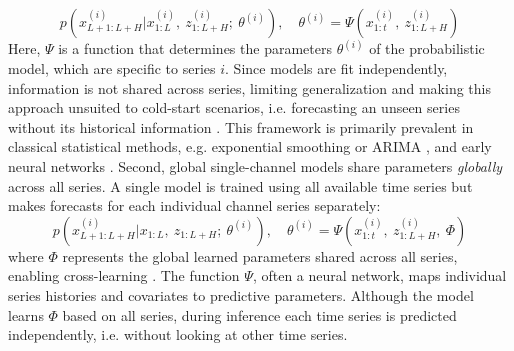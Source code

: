 \documentclass[a4paper,oneside,bibliography=totoc]{scrbook}
\begin{document}
\begin{equation}
    p(x^{(i)}_{L+1:L+H}|x^{(i)}_{ 1:L},\ z^{(i)}_{1:L+H};\ \theta^{(i)}), \quad \theta^{(i)}=\Psi(x^{(i)}_{1:t},\ z^{(i)}_{1:L+H})
    \label{eq:local_univariate}
\end{equation}
Here, $\Psi$ is a function that determines the parameters $\theta^{(i)}$ of the probabilistic model, which are specific to series $i$. 
Since models are fit independently, information is not shared across series, limiting generalization and making this approach unsuited to cold-start scenarios, i.e. forecasting an unseen series without its historical information \cite{benidis_deep_2022, montero-manso_principles_2021}. This framework is primarily prevalent in classical statistical methods, e.g. exponential smoothing \cite{hyndman_state_2002} or ARIMA \cite{hyndman_automatic_2008}, and early neural networks \cite{zhang_forecasting_1998}.
Second, global single-channel models \cite{januschowski_criteria_2020} share parameters \textit{globally} across all series. A single model is trained using all available time series but makes forecasts for each individual channel series separately:
\begin{equation}
    p(x^{(i)}_{L+1:L+H}|x_{1:L},\ z_{1:L+H};\ \theta^{(i)}), \quad \theta^{(i)}=\Psi(x^{(i)}_{1:t},\ z^{(i)}_{1:L+H},\ \Phi)
    \label{eq:global_univariate}
\end{equation}
where $\Phi$ represents the global learned parameters shared across all series, enabling cross-learning \cite{semenoglou_investigating_2021}. 
The function $\Psi$, often a neural network, maps individual series histories and covariates to predictive parameters. 
Although the model learns $\Phi$ based on all series, during inference each time series is predicted independently, i.e. without looking at other time series.
\end{document}
